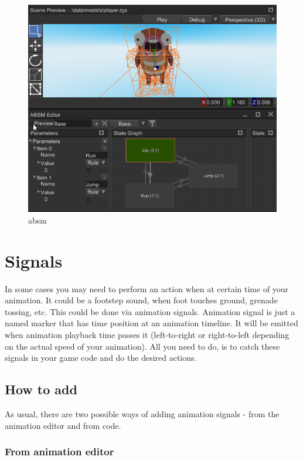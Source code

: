 \documentclass[
]{book}
\theoremstyle{definition}
\theoremstyle{definition}
\theoremstyle{definition}
\theoremstyle{definition}
\theoremstyle{remark}
\begin{document}
\begin{figure}
\centering
\includegraphics{images/animation/absm.gif}
\caption{absm}
\end{figure}

\section{Signals}\label{signals-1}

In some cases you may need to perform an action when at certain time of your animation. It could be a footstep sound, when foot touches ground, grenade tossing, etc. This could be done via animation signals. Animation signal is just a named marker that has time position at an animation timeline. It will be emitted when animation playback time passes it (left-to-right or right-to-left depending on the actual speed of your animation). All you need to do, is to catch these signals in your game code and do the desired actions.

\subsection{How to add}\label{how-to-add}

As usual, there are two possible ways of adding animation signals - from the animation editor and from code.

\subsubsection{From animation editor}\label{from-animation-editor}
\end{document}
